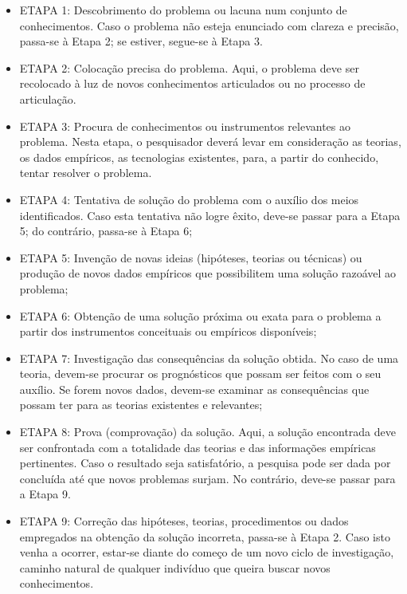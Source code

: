 \begin{itemize}
\item ETAPA 1: Descobrimento do problema ou lacuna num conjunto de conhecimentos.  Caso o problema não esteja enunciado com clareza e precisão, passa-se à Etapa 2; se estiver, segue-se à Etapa 3.
\item ETAPA 2: Colocação precisa do problema. Aqui, o problema deve ser recolocado à luz de novos conhecimentos articulados ou no processo de articulação.
\item ETAPA 3: Procura de conhecimentos ou instrumentos relevantes ao problema.  Nesta etapa, o pesquisador deverá levar em consideração as teorias, os dados empíricos, as tecnologias existentes, para, a partir do conhecido, tentar resolver o problema. 
\item ETAPA 4: Tentativa de solução do problema com o auxílio dos meios identificados.  Caso esta tentativa não logre êxito, deve-se passar para a Etapa 5; do contrário, passa-se à Etapa 6;
\item ETAPA 5: Invenção de novas ideias (hipóteses, teorias ou técnicas) ou produção de novos dados empíricos que possibilitem uma solução razoável ao problema;
\item ETAPA 6: Obtenção de uma solução próxima ou exata para o problema a partir dos instrumentos conceituais ou empíricos disponíveis;
\item ETAPA 7: Investigação das consequências da solução obtida. No caso de uma teoria, devem-se procurar os prognósticos que possam ser feitos com o seu auxílio. Se forem novos dados, devem-se examinar as consequências que possam ter para as teorias existentes e relevantes;
\item ETAPA 8: Prova (comprovação) da solução. Aqui, a solução encontrada deve ser confrontada com a totalidade das teorias e das informações empíricas pertinentes. Caso o resultado seja satisfatório, a pesquisa pode ser dada por concluída até que novos problemas surjam. No contrário, deve-se passar para a Etapa 9.
\item ETAPA 9: Correção das hipóteses, teorias, procedimentos ou dados empregados na obtenção da solução incorreta, passa-se à Etapa 2. Caso isto venha a ocorrer, estar-se diante do começo de um novo ciclo de investigação, caminho natural de qualquer indivíduo que queira buscar novos conhecimentos.
\end{itemize}

